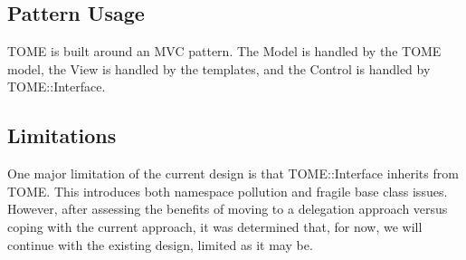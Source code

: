 \documentclass[12pt,titlepage]{article}
\begin{document}
\subsection{Pattern Usage}
TOME is built around an MVC pattern.  The Model is handled by the TOME model, the View is handled by the templates, and the Control is handled by TOME::Interface.
\subsection{Limitations}
One major limitation of the current design is that TOME::Interface inherits from TOME.  This introduces both namespace pollution and fragile base class issues.  However, after assessing the benefits of moving to a delegation approach versus coping with the current approach, it was determined that, for now, we will continue with the existing design, limited as it may be.
\end{document}
